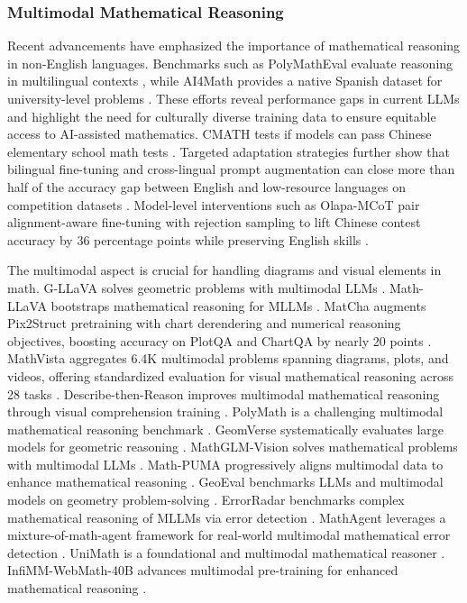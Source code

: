 \documentclass[acmsmall,anonymous]{acmart}
\begin{document}
\subsubsection{Multimodal Mathematical Reasoning}\label{sec:multilingual}
Recent advancements have emphasized the importance of mathematical reasoning in non-English languages. Benchmarks such as PolyMathEval evaluate reasoning in multilingual contexts \cite{anonymous2025polymatheval,anonymous2025polymatheval}, while AI4Math provides a native Spanish dataset for university-level problems \cite{perez2025ai4mathnativespanishbenchmark}. These efforts reveal performance gaps in current LLMs and highlight the need for culturally diverse training data to ensure equitable access to AI-assisted mathematics. CMATH tests if models can pass Chinese elementary school math tests \cite{wei2023cmath}. Targeted adaptation strategies further show that bilingual fine-tuning and cross-lingual prompt augmentation can close more than half of the accuracy gap between English and low-resource languages on competition datasets \cite{chen-2024-multilingual-math}.  Model-level interventions such as Olapa-MCoT pair alignment-aware fine-tuning with rejection sampling to lift Chinese contest accuracy by 36 percentage points while preserving English skills \cite{zhu-2023-olapa-mcot}.

The multimodal aspect is crucial for handling diagrams and visual elements in math. G-LLaVA solves geometric problems with multimodal LLMs \cite{gao2023}. Math-LLaVA bootstraps mathematical reasoning for MLLMs \cite{shi2024}. MatCha augments Pix2Struct pretraining with chart derendering and numerical reasoning objectives, boosting accuracy on PlotQA and ChartQA by nearly 20 points \cite{liu-2023-matcha}. MathVista aggregates 6.4K multimodal problems spanning diagrams, plots, and videos, offering standardized evaluation for visual mathematical reasoning across 28 tasks \cite{lu-2024-mathvista}. Describe-then-Reason improves multimodal mathematical reasoning through visual comprehension training \cite{jia2024}. PolyMath is a challenging multimodal mathematical reasoning benchmark \cite{gupta2024}. GeomVerse systematically evaluates large models for geometric reasoning \cite{kazemi2023}. MathGLM-Vision solves mathematical problems with multimodal LLMs \cite{yang2024b}. Math-PUMA progressively aligns multimodal data to enhance mathematical reasoning \cite{zhuang2024}. GeoEval benchmarks LLMs and multimodal models on geometry problem-solving \cite{zhang2024d}. ErrorRadar benchmarks complex mathematical reasoning of MLLMs via error detection \cite{yan2024a}. MathAgent leverages a mixture-of-math-agent framework for real-world multimodal mathematical error detection \cite{yan2025b}. UniMath is a foundational and multimodal mathematical reasoner \cite{liang2023a}. InfiMM-WebMath-40B advances multimodal pre-training for enhanced mathematical reasoning \cite{han2024}.
\end{document}
